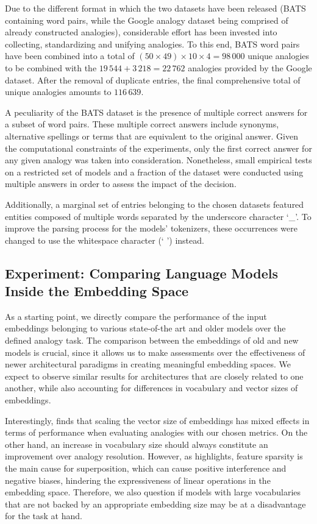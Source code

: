 Due to the different format in which the two datasets have been released (BATS containing word pairs, while the Google analogy dataset being comprised of already constructed analogies), considerable effort has been invested into collecting, standardizing and unifying analogies.
To this end, BATS word pairs have been combined into a total of $(50 \times 49) \times 10 \times 4 = 98\,000$ unique analogies to be combined with the $19\,544 + 3\,218 = 22\,762$ analogies provided by the Google dataset.
After the removal of duplicate entries, the final comprehensive total of unique analogies amounts to $116\,639$.

A peculiarity of the BATS dataset is the presence of multiple correct answers for a subset of word pairs.
These multiple correct answers include synonyms, alternative spellings or terms that are equivalent to the original answer.
Given the computational constraints of the experiments, only the first correct answer for any given analogy was taken into consideration.
Nonetheless, small empirical tests on a restricted set of models and a fraction of the dataset were conducted using multiple answers in order to assess the impact of the decision.

Additionally, a marginal set of entries belonging to the chosen datasets featured entities composed of multiple words separated by the underscore character `\_'.
To improve the parsing process for the models' tokenizers, these occurrences were changed to use the whitespace character (` ') instead.

\subsection{Experiment: Comparing Language Models \texorpdfstring{\linebreak}{} Inside the Embedding Space}\label{ssec:exp_emb_exp1}

As a starting point, we directly compare the performance of the input embeddings belonging to various state-of-the art and older models over the defined analogy task.
The comparison between the embeddings of old and new models is crucial, since it allows us to make assessments over the effectiveness of newer architectural paradigms in creating meaningful embedding spaces.
We expect to observe similar results for architectures that are closely related to one another, while also accounting for differences in vocabulary and vector sizes of embeddings.

Interestingly, \citet{drozd2016} finds that scaling the vector size of embeddings has mixed effects in terms of performance when evaluating analogies with our chosen metrics.
On the other hand, an increase in vocabulary size should always constitute an improvement over analogy resolution.
However, as \citet{elhage2022} highlights, feature sparsity is the main cause for superposition, which can cause positive interference and negative biases, hindering the expressiveness of linear operations in the embedding space.
Therefore, we also question if models with large vocabularies that are not backed by an appropriate embedding size may be at a disadvantage for the task at hand.

